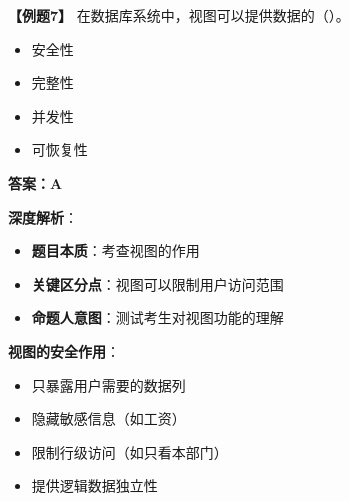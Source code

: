 \documentclass[12pt, a4paper]{article}
\newenvironment{bluebox}[1]{%
  \begin{trivlist}
  \item[\hskip\labelsep \textbf{#1}]
  \setlength{\parskip}{0.5ex}
  \setlength{\itemsep}{0.5ex}
}{%
  \end{trivlist}
}
\begin{document}
\begin{bluebox}{例题7：视图安全性}
	\textbf{【例题7】} 在数据库系统中，视图可以提供数据的（\quad）。

	\begin{itemize}
		\item[A)] 安全性
		\item[B)] 完整性
		\item[C)] 并发性
		\item[D)] 可恢复性
	\end{itemize}

	\textbf{答案：A}

	\textbf{深度解析}：

	\begin{itemize}
		\item \textbf{题目本质}：考查视图的作用
		\item \textbf{关键区分点}：视图可以限制用户访问范围
		\item \textbf{命题人意图}：测试考生对视图功能的理解
	\end{itemize}

	\textbf{视图的安全作用}：
	\begin{itemize}
		\item 只暴露用户需要的数据列
		\item 隐藏敏感信息（如工资）
		\item 限制行级访问（如只看本部门）
		\item 提供逻辑数据独立性
	\end{itemize}
\end{bluebox}
\end{document}
